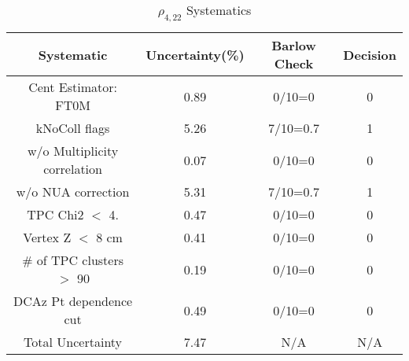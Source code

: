 \begin{table}[htbp]
\caption{$\rho_{4,22}$ Systematics}
\label{tab:Sys_rho422}
\centering
\begin{tabular}{|c|c|c|c|}
\hline
Systematic & Uncertainty(\%) & Barlow Check & Decision \\
\hline
Cent Estimator: FT0M & 0.89 & 0/10=0 & 0 \\
kNoColl flags & 5.26 & 7/10=0.7 & 1 \\
w/o Multiplicity correlation & 0.07 & 0/10=0 & 0 \\
w/o NUA correction & 5.31 & 7/10=0.7 & 1 \\
TPC Chi2 $<$ 4. & 0.47 & 0/10=0 & 0 \\
Vertex Z $<$ 8 cm & 0.41 & 0/10=0 & 0 \\
\# of TPC clusters $>$ 90 & 0.19 & 0/10=0 & 0 \\
DCAz Pt dependence cut & 0.49 & 0/10=0 & 0 \\
\hline
Total Uncertainty & 7.47 & N/A & N/A \\
\hline
\end{tabular}
\end{table}

